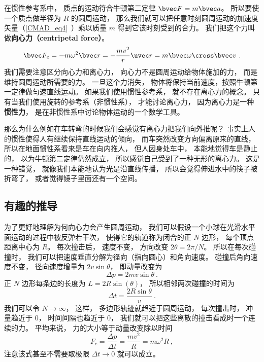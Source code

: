 

在惯性参考系中， 质点的运动符合牛顿第二定律 $\bvec F = m\bvec a$。 所以要使一个质点做半径为 $R$ 的圆周运动， 那么我们就可以把任意时刻圆周运动的加速度矢量（\autoref{CMAD_eq4}~）乘以质量 $m$ 得到它该时刻受到的合力。 我们把这个力叫做\textbf{向心力（centripetal force）}。
\begin{equation}
\bvec F_c = -m \omega^2 \bvec r = -\frac{mv^2}{r}\uvec r = m\bvec \omega \cross \bvec v~.
\end{equation}
我们需要注意区分向心力和离心力， 向心力不是圆周运动给物体施加的力， 而是维持圆周运动所需要的力。 一旦这个力消失， 物体将保持当前速度，按照牛顿第一定律做匀速直线运动。 如果我们使用惯性参考系， 就不存在离心力的概念。 只有当我们使用旋转的参考系（非惯性系）， 才能讨论离心力， 因为离心力是一种\textbf{惯性力}， 是在非惯性系中讨论物体运动的一个数学工具。

那么为什么例如在车转弯的时候我们会感觉有离心力把我们向外推呢？ 事实上人的惯性使得人有继续保持直线运动的倾向， 而车突然改变方向偏离原来的直线， 所以在地面惯性系看来是车在向内推人， 但人因身处车中， 本能地觉得车是静止的， 以为牛顿第二定律仍然成立， 所以感觉自己受到了一种无形的离心力。 这是一种错觉， 就像我们本能地认为光是沿直线传播， 所以会觉得伸进水中的筷子被折弯了， 或者觉得镜子里面还有一个空间。

\subsection{有趣的推导}
为了更好地理解为何向心力会产生圆周运动， 我们可以假设一个小球在光滑水平面运动的过程中被反弹若干次， 使得它的轨道称为闭合的正 $N$ 边形， 每个顶点距离中心为 $R$。 每次撞击后， 速度不变， 方向改变 $2\theta  = 2\pi/N$。
所以在每次碰撞时， 我们可以把速度垂直分解为径向（指向圆心）和角向速度。 碰撞后角向速度不变， 径向速度增量为 $2v\sin\theta$， 即动量改变为
\begin{equation}
\Delta p = 2mv\sin\theta~.
\end{equation}
正 $N$ 边形每条边的长度为 $L = 2R\sin(\theta)$， 所以相邻两次碰撞的时间为
\begin{equation}
\Delta t = \frac{2R\sin\theta}{v}~.
\end{equation}
我们可以令 $N \to \infty$， 这样， 多边形轨迹就趋近于圆周运动， 每次撞击时， 冲量趋近于 0， 时间间隔也趋近于 0， 我们就可以把这些离散的撞击看成时一个连续的力。 平均来说， 力的大小等于动量改变除以时间
\begin{equation}
F_c = \frac{\Delta p}{\Delta t} = \frac{mv^2}{R} = m\omega^2 R~,
\end{equation}
注意该式甚至不需要取极限 $\Delta t \to 0$ 就可以成立。

